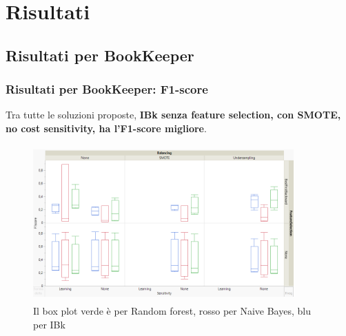 \documentclass{beamer}
\begin{document}
\section{Risultati}
\subsection{Risultati per BookKeeper}
\begin{frame}
	\frametitle{Risultati per BookKeeper: F1-score}
	
	\fontsize{7pt}{8pt}\selectfont
	
	Tra tutte le soluzioni proposte, \textbf{IBk senza
	feature selection, con SMOTE, no cost sensitivity, ha l'F1-score migliore}.
	
	\centering
	\begin{figure}
	\includegraphics[width=10cm, height=6cm]{bookkeeper-f1score}
	\caption{Il box plot verde è per Random forest, rosso per Naive Bayes, blu per IBk}
	\end{figure}
\end{frame}
\end{document}
